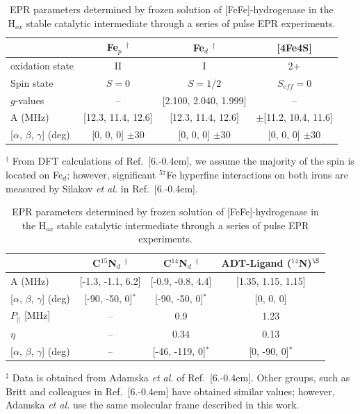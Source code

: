 \begin{table}[hb]
\caption[EPR parameters determined for FeFe-hydrogenase in Hox state.]{EPR parameters determined by frozen solution of [FeFe]-hydrogenase in the H$_{ox}$ stable catalytic intermediate through a series of pulse EPR experiments.}
\centering
\begin{tabular}{l|c|c||c}
 & Fe$_p$ $^\dagger$ & Fe$_d$ $^\dagger$ & {[}4Fe4S{]} \\ \hline \hline
oxidation state & II & I & 2+ \\
Spin state & $S=0$ & $S=1/2$ & $S_{eff}=0$ \\
$g$-values & -- & {[}2.100, 2.040, 1.999{]} & -- \\
A (MHz) & {[}12.3, 11.4, 12.6{]} & {[}12.3, 11.4, 12.6{]} & $\pm${[}11.2, 10.4, 11.6{]} \\
{[}$\alpha$, $\beta$, $\gamma${]} (deg) & {[}0, 0, 0{]} $\pm$30 & {[}0, 0, 0{]} $\pm$30 & {[}0, 0, 0{]} $\pm$30
\end{tabular}
\begin{flushleft}\footnotesize{$^\dagger$ From DFT calculations of Ref.~[6.\kern-0.4em], we assume the majority of the spin is located on Fe$_d$; however, significant $^{57}$Fe hyperfine interactions on both irons are measured by Silakov \textit{et al.} in Ref.~[6.\kern-0.4em].} \end{flushleft}

\begin{tabular}{l|c|c|c}
& C$^{15}$N$_d$ $^\ddagger$ & C$^{14}$N$_d$ $^\ddagger$ & ADT-Ligand ($^{14}$N)$^{\S}$\\ \hline \hline
A (MHz) &  {[}-1.3, -1.1, 6.2{]} & {[}-0.9, -0.8, 4.4{]} & {[}1.35, 1.15, 1.15{]}\\
{[}$\alpha$, $\beta$, $\gamma${]} (deg) & {[}-90, -50, 0{]}$^\ast$ & {[}-90, -50, 0{]}$^\ast$ & {[}0, 0, 0{]}\\
$P_{||}$ {[}MHz{]} &  -- & 0.9 & 1.23\\ 
$\eta$ & -- & 0.34 & 0.13 \\
{[}$\alpha$, $\beta$, $\gamma${]} (deg) & -- & {[}-46, -119, 0{]}$^\ast$ & {[}0, -90, 0{]}$^\ast$
\end{tabular}
\begin{flushleft}\footnotesize{$^\ddagger$ Data is obtained from Adamska \textit{et al.} of Ref.~[6.\kern-0.4em]. Other groups, such as Britt and colleagues in Ref.~[6.\kern-0.4em] have obtained similar values; however, Adamska \textit{et al.} use the same molecular frame described in this work. 

}
\end{flushleft}
\end{table}
